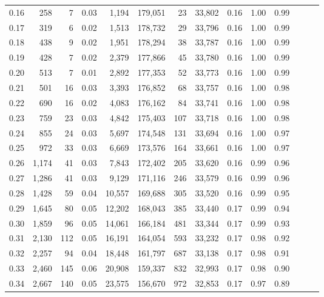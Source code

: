 \begin{tabular}{rrrrrrrrrrrrrr}
0.16 &    258 &      7 &  0.03 &    1,194 &  179,051 &      23 &  33,802 &  0.16 &  1.00 &      0.99 \\
0.17 &    319 &      6 &  0.02 &    1,513 &  178,732 &      29 &  33,796 &  0.16 &  1.00 &      0.99 \\
0.18 &    438 &      9 &  0.02 &    1,951 &  178,294 &      38 &  33,787 &  0.16 &  1.00 &      0.99 \\
0.19 &    428 &      7 &  0.02 &    2,379 &  177,866 &      45 &  33,780 &  0.16 &  1.00 &      0.99 \\
0.20 &    513 &      7 &  0.01 &    2,892 &  177,353 &      52 &  33,773 &  0.16 &  1.00 &      0.99 \\
0.21 &    501 &     16 &  0.03 &    3,393 &  176,852 &      68 &  33,757 &  0.16 &  1.00 &      0.98 \\
0.22 &    690 &     16 &  0.02 &    4,083 &  176,162 &      84 &  33,741 &  0.16 &  1.00 &      0.98 \\
0.23 &    759 &     23 &  0.03 &    4,842 &  175,403 &     107 &  33,718 &  0.16 &  1.00 &      0.98 \\
0.24 &    855 &     24 &  0.03 &    5,697 &  174,548 &     131 &  33,694 &  0.16 &  1.00 &      0.97 \\
0.25 &    972 &     33 &  0.03 &    6,669 &  173,576 &     164 &  33,661 &  0.16 &  1.00 &      0.97 \\
0.26 &  1,174 &     41 &  0.03 &    7,843 &  172,402 &     205 &  33,620 &  0.16 &  0.99 &      0.96 \\
0.27 &  1,286 &     41 &  0.03 &    9,129 &  171,116 &     246 &  33,579 &  0.16 &  0.99 &      0.96 \\
0.28 &  1,428 &     59 &  0.04 &   10,557 &  169,688 &     305 &  33,520 &  0.16 &  0.99 &      0.95 \\
0.29 &  1,645 &     80 &  0.05 &   12,202 &  168,043 &     385 &  33,440 &  0.17 &  0.99 &      0.94 \\
0.30 &  1,859 &     96 &  0.05 &   14,061 &  166,184 &     481 &  33,344 &  0.17 &  0.99 &      0.93 \\
0.31 &  2,130 &    112 &  0.05 &   16,191 &  164,054 &     593 &  33,232 &  0.17 &  0.98 &      0.92 \\
0.32 &  2,257 &     94 &  0.04 &   18,448 &  161,797 &     687 &  33,138 &  0.17 &  0.98 &      0.91 \\
0.33 &  2,460 &    145 &  0.06 &   20,908 &  159,337 &     832 &  32,993 &  0.17 &  0.98 &      0.90 \\
0.34 &  2,667 &    140 &  0.05 &   23,575 &  156,670 &     972 &  32,853 &  0.17 &  0.97 &      0.89 \\

\end{tabular}
